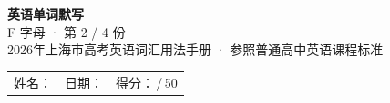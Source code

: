\documentclass[10pt,a4paper]{article}
\begin{document}
\pagestyle{plain}

\begin{center}
{\LARGE\bfseries 英语单词默写}\\[0.22em]
{\large F 字母 · 第 2 / 4 份}\\[0.18em]
{\small 2026年上海市高考英语词汇用法手册 · 参照普通高中英语课程标准}
\end{center}

\vspace{0.25em}
\noindent\begin{tabular}{@{}p{}@{}p{}@{}p{}@{}}
姓名：\underline{\hspace{2.0cm}} & 日期：\underline{\hspace{2.0cm}} & 得分：\underline{\hspace{1.3cm}}\,/\,50 \\
\end{tabular}

\vspace{0.3em}

\vspace{0.08em}
\end{document}
